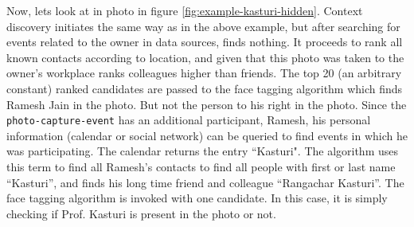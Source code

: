Now, lets look at in photo in figure \ref{fig:example-kasturi-hidden}. Context discovery initiates the same way as in the above example, but after searching for events related to the owner in data sources, finds nothing. It proceeds to rank all known contacts according to location, and given that this photo was taken to the owner's workplace ranks colleagues higher than friends. The top 20 (an arbitrary constant) ranked candidates are passed to the face tagging algorithm which finds Ramesh Jain in the photo. But not the person to his right in the photo. Since the \texttt{photo-capture-event} has an additional participant, Ramesh, his personal information (calendar or social network) can be queried to find events in which he was participating. The calendar returns the entry ``Kasturi". The algorithm uses this term to find all Ramesh's contacts to find all people with first or last name ``Kasturi'', and finds his long time friend and colleague ``Rangachar Kasturi''. The face tagging algorithm is invoked with one candidate. In this case, it is simply checking if Prof. Kasturi is present in the photo or not.


